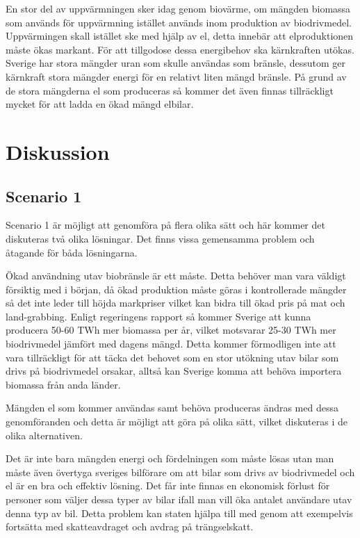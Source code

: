 \documentclass[a4paper,11pt,fleqn, titlepage]{article}
\begin{document}
En stor del av uppvärmningen sker idag genom biovärme, om mängden biomassa som används för uppvärmning istället används inom produktion av biodrivmedel. Uppvärmingen skall istället ske med hjälp av el, detta innebär att elproduktionen måste ökas markant. För att tillgodose dessa energibehov ska kärnkraften utökas. Sverige har stora mängder uran som skulle användas som bränsle, dessutom ger kärnkraft stora mängder energi för en relativt liten mängd bränsle. På grund av de stora mängderna el som produceras så kommer det även finnas tillräckligt mycket för att ladda en ökad mängd elbilar.


\section{Diskussion}

\subsection{Scenario 1}
Scenario 1 är möjligt att genomföra på flera olika sätt och här kommer det diskuteras två olika lösningar. 
Det finns vissa gemensamma problem och åtagande för båda lösningarna.

Ökad användning utav biobränsle är ett måste. Detta behöver man vara väldigt försiktig med i början, då ökad produktion måste göras i kontrollerade mängder så det inte leder till höjda markpriser vilket kan bidra till ökad pris på mat och land-grabbing.
Enligt regeringens rapport så kommer Sverige att kunna producera 50-60 TWh mer biomassa per år, vilket motsvarar 25-30 TWh mer biodrivmedel jämfört med dagens mängd. Detta kommer förmodligen inte att vara tillräckligt för att täcka det behovet som en stor utökning utav bilar som drivs på biodrivmedel orsakar, alltså kan Sverige komma att behöva importera biomassa från anda länder.

Mängden el som kommer användas samt behöva produceras ändras med dessa genomföranden och detta är möjligt att göra på olika sätt, vilket diskuteras i de olika alternativen.

Det är inte bara mängden energi och fördelningen som måste lösas utan man måste även övertyga sveriges bilförare om att bilar som drivs av biodrivmedel och el är en bra och effektiv lösning.
Det får inte finnas en ekonomisk förlust för personer som väljer dessa typer av bilar ifall man vill öka antalet användare utav denna typ av bil. Detta problem kan staten hjälpa till med genom att exempelvis fortsätta med skatteavdraget och avdrag på trängselskatt.
\end{document}
